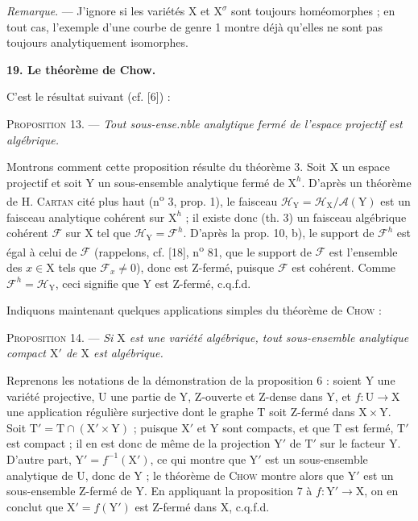 
\textit{Remarque}. --- J'ignore si les variétés $\mathrm{X}$ et $\mathrm{X}^\sigma$ sont toujours homéomorphes ; en tout cas, l'exemple d'une courbe de genre 1 montre déjà qu'elles ne sont pas toujours analytiquement isomorphes.


\textbf{19. Le théorème de Chow.}

C'est le résultat suivant (cf. [6]) :

\textsc{Proposition} 13. --- \textit{Tout sous-ense.nble analytique fermé de l'espace projectif est algébrique.}

Montrons comment cette proposition résulte du théorème 3. Soit $\mathrm{X}$ un espace projectif et soit $\mathrm{Y}$ un sous-ensemble analytique fermé de $\mathrm{X}^h$. D'après un théorème de H. \textsc{Cartan} cité plus haut (n\textsuperscript{o} 3, prop. 1), le faisceau $\mathcal{H}_\mathrm{Y} = \mathcal{H}_\mathrm{X}/\mathcal{A}(\mathrm{Y})$ est un faisceau analytique cohérent sur $\mathrm{X}^h$ ; il existe donc (th. 3) un faisceau algébrique cohérent $\mathcal{F}$ sur $\mathrm{X}$ tel que $\mathcal{H}_\mathrm{Y} = \mathcal{F}^h$. D'après la prop. 10, b), le support de $\mathcal{F}^h$ est égal à celui de $\mathcal{F}$ (rappelons, cf. [18], n\textsuperscript{o} 81, que le support de $\mathcal{F}$ est l'ensemble des $x \in \mathrm{X}$ tels que $\mathcal{F}_x \neq 0$), donc est Z-fermé, puisque $\mathcal{F}$ est cohérent. Comme $\mathcal{F}^h = \mathcal{H}_\mathrm{Y}$, ceci signifie que $\mathrm{Y}$ est Z-fermé, c.q.f.d.

Indiquons maintenant quelques applications simples du théorème de \textsc{Chow} :

\textsc{Proposition} 14. --- \textit{Si $\mathrm{X}$ est une variété algébrique, tout sous-ensemble analytique compact $\mathrm{X}'$ de $\mathrm{X}$ est algébrique.}

Reprenons les notations de la démonstration de la proposition 6 : soient $\mathrm{Y}$ une variété projective, $\mathrm{U}$ une partie de $\mathrm{Y}$, Z-ouverte et Z-dense dans $\mathrm{Y}$, et $f : \mathrm{U} \to \mathrm{X}$ une application régulière surjective dont le graphe $\mathrm{T}$ soit Z-fermé dans $\mathrm{X} \times \mathrm{Y}$. Soit $\mathrm{T}' = \mathrm{T} \cap (\mathrm{X}' \times \mathrm{Y})$ ; puisque $\mathrm{X}'$ et $\mathrm{Y}$ sont compacts, et que $\mathrm{T}$ est fermé, $\mathrm{T}'$ est compact ; il en est donc de même de la projection $\mathrm{Y}'$ de $\mathrm{T}'$ sur le facteur $\mathrm{Y}$. D'autre part, $\mathrm{Y}' = f^{-1}(\mathrm{X}')$, ce qui montre que $\mathrm{Y}'$ est un sous-ensemble analytique de $\mathrm{U}$, donc de $\mathrm{Y}$ ; le théorème de \textsc{Chow} montre alors que $\mathrm{Y}'$ est un sous-ensemble Z-fermé de $\mathrm{Y}$. En appliquant la proposition 7 à $f : \mathrm{Y}' \to \mathrm{X}$, on en conclut que $\mathrm{X}' = f(\mathrm{Y}')$ est Z-fermé dans $\mathrm{X}$, c.q.f.d.

